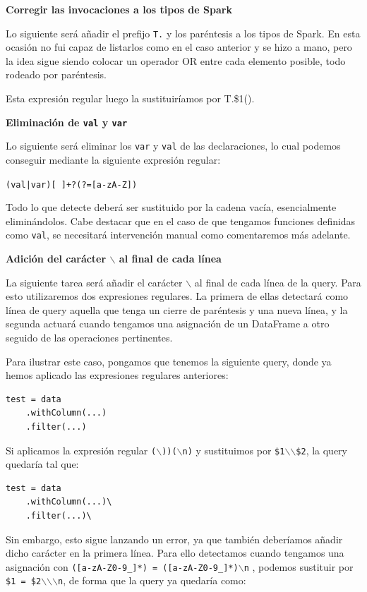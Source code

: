 \documentclass[12pt,twoside,titlepage]{report}
\begin{document}
\textbf{Corregir las invocaciones a los tipos de Spark}

Lo siguiente será añadir el prefijo \texttt{T.} y los paréntesis a los tipos de Spark. En esta ocasión no fui capaz de listarlos como en el caso anterior y se hizo a mano, pero la idea sigue siendo colocar un operador OR entre cada elemento posible, todo rodeado por paréntesis.

Esta expresión regular luego la sustituiríamos por T.\$1().


\textbf{Eliminación de \texttt{val} y \texttt{var}}

Lo siguiente será eliminar los \texttt{var} y \texttt{val} de las declaraciones, lo cual podemos conseguir mediante la siguiente expresión regular:

\texttt{(val|var)[ ]+?(?=[a-zA-Z])}

Todo lo que detecte deberá ser sustituido por la cadena vacía, esencialmente eliminándolos. Cabe destacar que en el caso de que tengamos funciones definidas como \texttt{val}, se necesitará intervención manual como comentaremos más adelante.


\textbf{Adición del carácter \texttt{$\backslash$} al final de cada línea}

La siguiente tarea será añadir el carácter \texttt{$\backslash$} al final de cada línea de la query. Para esto utilizaremos dos expresiones regulares. La primera de ellas detectará como línea de query aquella que tenga un cierre de paréntesis y una nueva línea, y la segunda actuará cuando tengamos una asignación de un DataFrame a otro seguido de las operaciones pertinentes.

Para ilustrar este caso, pongamos que tenemos la siguiente query, donde ya hemos aplicado las expresiones regulares anteriores:

\begin{lstlisting}
test = data
	.withColumn(...)
	.filter(...)
\end{lstlisting}

Si aplicamos la expresión regular \texttt{($\backslash$))($\backslash$n)} y sustituimos por  \texttt{\$1$\backslash$$\backslash$\$2}, la query quedaría tal que:

\begin{lstlisting}
test = data
	.withColumn(...)\
	.filter(...)\
\end{lstlisting}

Sin embargo, esto sigue lanzando un error, ya que también deberíamos añadir dicho carácter en la primera línea. Para ello detectamos cuando tengamos una asignación con \texttt{([a-zA-Z0-9\-\_]*) = ([a-zA-Z0-9\-\_]*)$\backslash$n}
, podemos sustituir por \texttt{\$1 = \$2$\backslash$$\backslash$$\backslash$n}, de forma que la query ya quedaría como:
\end{document}
